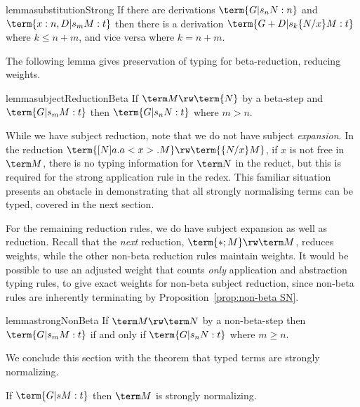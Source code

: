 \documentclass[a4paper,UKenglish,cleveref, autoref, thm-restate]{lipics-v2021}
\begin{document}
\begin{restatable}{lemma}{substitutionStrong}
\label{lem:strong substitution}
If there are derivations $\term{G |s_n N:n}$ and $\term{x:n , D |s_m M:t}$ then there is a derivation $\term{G+D |s_k \{N/x\}M :t}$ where $k\leq n+m$, and vice versa where $k=n+m$.
\end{restatable}


The following lemma gives preservation of typing for beta-reduction, reducing weights.


\begin{restatable}{lemma}{subjectReductionBeta}
\label{lem:beta subject reduction}
If $\term M\rw\term{N}$ by a beta-step and $\term{G |s_m M:t}$ then $\term{G |s_n N:t}$ where $m>n$.
\end{restatable}


While we have subject reduction, note that we do not have subject \emph{expansion}. In the reduction $\term{[N]a.a<x>.M}\rw\term{\{N/x\}M}$, if $x$ is not free in $\term M$, there is no typing information for $\term N$ in the reduct, but this is required for the strong application rule in the redex. This familiar situation presents an obstacle in demonstrating that all strongly normalising terms can be typed, covered in the next section.

For the remaining reduction rules, we do have subject expansion as well as reduction. Recall that the \emph{next} reduction, $\term{*;M}\rw\term M$, reduces weights, while the other non-beta reduction rules maintain weights. It would be possible to use an adjusted weight that counts \emph{only} application and abstraction typing rules, to give exact weights for non-beta subject reduction, since non-beta rules are inherently terminating by Proposition~\ref{prop:non-beta SN}.

\begin{restatable}{lemma}{strongNonBeta}
\label{lem:non-beta subject reduction}
If $\term M\rw\term N$ by a non-beta-step then $\term{G |s_m M:t}$ if and only if $\term{G |s_n N:t}$ where $m\geq n$.
\end{restatable}

We conclude this section with the theorem that typed terms are strongly normalizing.

\begin{theorem}
\label{thm:SN}
If $\term{G |s M:t}$ then $\term M$ is strongly normalizing.
\end{theorem}
\end{document}
